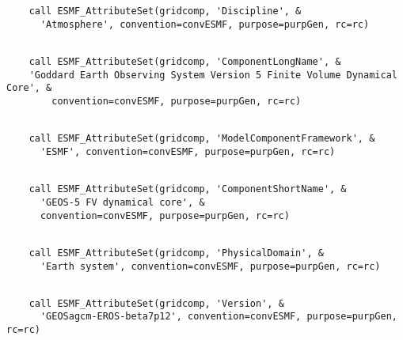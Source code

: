 
 \begin{verbatim}
    call ESMF_AttributeSet(gridcomp, 'Discipline', &
      'Atmosphere', convention=convESMF, purpose=purpGen, rc=rc)
 
\end{verbatim}
 

 \begin{verbatim}
    call ESMF_AttributeSet(gridcomp, 'ComponentLongName', &
    'Goddard Earth Observing System Version 5 Finite Volume Dynamical Core', &
        convention=convESMF, purpose=purpGen, rc=rc)
 
\end{verbatim}
 

 \begin{verbatim}
    call ESMF_AttributeSet(gridcomp, 'ModelComponentFramework', &
      'ESMF', convention=convESMF, purpose=purpGen, rc=rc)
 
\end{verbatim}
 

 \begin{verbatim}
    call ESMF_AttributeSet(gridcomp, 'ComponentShortName', &
      'GEOS-5 FV dynamical core', &
      convention=convESMF, purpose=purpGen, rc=rc)
 
\end{verbatim}
 

 \begin{verbatim}
    call ESMF_AttributeSet(gridcomp, 'PhysicalDomain', &
      'Earth system', convention=convESMF, purpose=purpGen, rc=rc)
 
\end{verbatim}
 

 \begin{verbatim}
    call ESMF_AttributeSet(gridcomp, 'Version', &
      'GEOSagcm-EROS-beta7p12', convention=convESMF, purpose=purpGen, rc=rc)
 
\end{verbatim}
 
